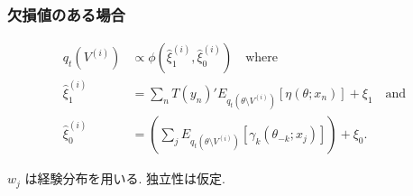 \documentclass[dvipdfmx, dvipsnames]{beamer}
\begin{document}
\appendix
\begin{frame}
\frametitle{欠損値のある場合}

\begin{align*}
q_t (V^{(i)}) & \propto \phi \left(\hat{\xi}^{(i)}_1 , \hat{\xi}^{(i)}_0 \right)  \quad \mbox{where}\\
\hat \xi^{(i)}_1 &=\sum_n T(y_{n})' E_{q_t (\theta \setminus V^{(i)}) } \left [  \eta(\theta; x_{n}) \right] + \xi_1 \quad \mbox{and}\\
\hat \xi^{(i)}_0 &=   \left(\sum_{j}E_{q_t(\theta \setminus V^{(i)})}[ \gamma_k(\theta_{-k}; x_{j}) ]\right) + \xi_0.
\end{align*}

$w_j$ は経験分布を用いる. 独立性は仮定. 
\end{frame}
\end{document}
